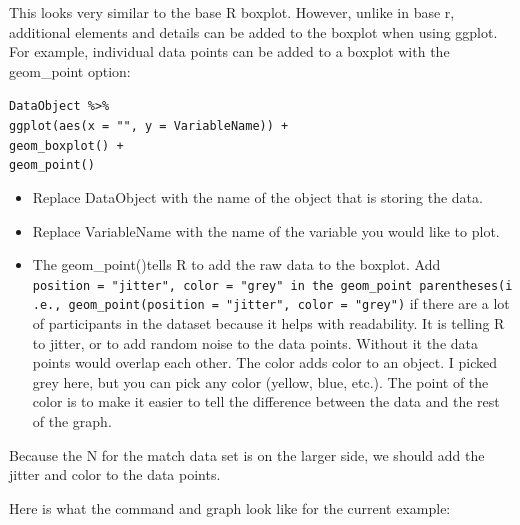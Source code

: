\documentclass[
]{book}
\newenvironment{Shaded}{\begin{snugshade}}{\end{snugshade}}
\newcommand{\DataTypeTok}[1]{\textcolor[rgb]{0.13,0.29,0.53}{#1}}
\newcommand{\KeywordTok}[1]{\textcolor[rgb]{0.13,0.29,0.53}{\textbf{#1}}}
\newcommand{\NormalTok}[1]{#1}
\newcommand{\OperatorTok}[1]{\textcolor[rgb]{0.81,0.36,0.00}{\textbf{#1}}}
\newcommand{\StringTok}[1]{\textcolor[rgb]{0.31,0.60,0.02}{#1}}
\providecommand{\tightlist}{%
  \setlength{\itemsep}{0pt}\setlength{\parskip}{0pt}}
\begin{document}
This looks very similar to the base R boxplot. However, unlike in base r, additional elements and details can be added to the boxplot when using ggplot. For example, individual data points can be added to a boxplot with the geom\_point option:

\texttt{DataObject\ \%\textgreater{}\%}\\
\texttt{ggplot(aes(x\ =\ "",\ y\ =\ VariableName))\ +}~\\
\texttt{geom\_boxplot()\ +}~\\
\texttt{geom\_point()}

\begin{itemize}
\tightlist
\item
  Replace DataObject with the name of the object that is storing the data.
\item
  Replace VariableName with the name of the variable you would like to plot.
\item
  The geom\_point()tells R to add the raw data to the boxplot. Add \texttt{position\ =\ "jitter",\ color\ =\ "grey"\ in\ the\ geom\_point\ parentheses(i.e.,\ geom\_point(position\ =\ "jitter",\ color\ =\ "grey")} if there are a lot of participants in the dataset because it helps with readability. It is telling R to jitter, or to add random noise to the data points. Without it the data points would overlap each other. The color adds color to an object. I picked grey here, but you can pick any color (yellow, blue, etc.). The point of the color is to make it easier to tell the difference between the data and the rest of the graph.
\end{itemize}

Because the N for the match data set is on the larger side, we should add the jitter and color to the data points.

Here is what the command and graph look like for the current example:

\begin{Shaded}
\end{Shaded}
\end{document}
